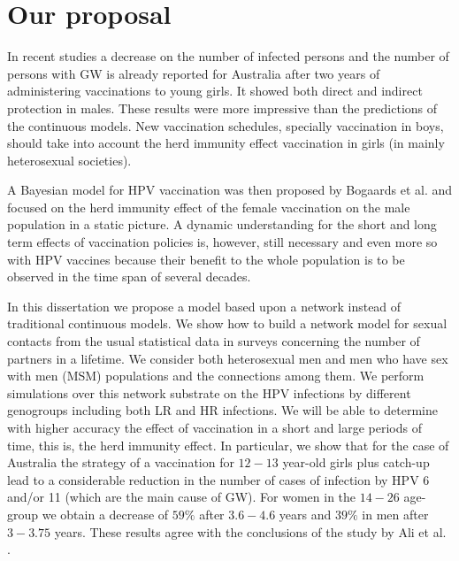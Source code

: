 \section{Our proposal}

In recent studies \cite{ali2013genital,fairley2009rapid} a decrease on the number of infected persons and the number of persons with GW is already reported for Australia after two years of administering vaccinations to young girls. It showed both direct and indirect protection in males. These results were more impressive than the predictions of the continuous models. New vaccination schedules, specially vaccination in boys, should take into account the herd immunity effect vaccination in girls (in mainly heterosexual societies). 

A Bayesian model for HPV vaccination was then proposed by Bogaards et al. \cite{bogaards2015direct} and focused on the herd immunity effect of the female vaccination on the male population in a static picture. A dynamic understanding for the short and long term effects of vaccination policies is, however, still necessary and even more so with HPV vaccines because their benefit to the whole population is to be observed in the time span of several decades.

In this dissertation we propose a model based upon a network instead of traditional continuous models. We show how to build a network model for sexual contacts from the usual statistical data in surveys concerning the number of partners in a lifetime. We consider both heterosexual men and men who have sex with men (MSM) populations and the connections among them. We perform simulations over this network substrate on the HPV infections by different genogroups including both LR and HR infections. We will be able to determine with higher accuracy the effect of vaccination in a short and large periods of time, this is, the herd immunity effect. In particular, we show that for the case of Australia the strategy of a vaccination for $12-13$ year-old girls plus catch-up lead to a considerable reduction in the number of cases of infection by HPV 6 and/or 11 (which are the main cause of GW). For women in the $14-26$ age-group we obtain a decrease of $59\%$ after $3.6-4.6$ years and $39\%$ in men after $3-3.75$ years. These results agree with the conclusions of the study by Ali et al. \cite{ali2013genital}.

